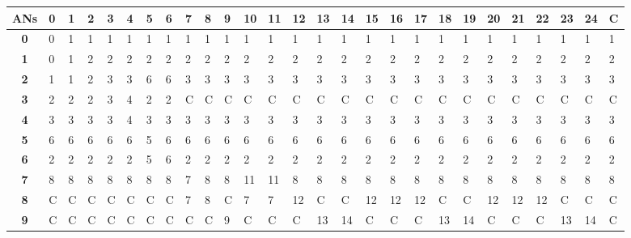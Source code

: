 \begin{table}[ht]\tiny
 \begin{center}
  \begin{tabular}{|c|p{0.1cm}|p{0.1cm}|p{0.1cm}|p{0.1cm}|p{0.1cm}|p{0.1cm}|p{0.1cm}|p{0.1cm}|p{0.1cm}|p{0.1cm}|p{0.1cm}|p{0.1cm}|p{0.1cm}|p{0.1cm}|p{0.1cm}|p{0.1cm}|p{0.1cm}|p{0.1cm}|p{0.1cm}|p{0.1cm}|p{0.1cm}|p{0.1cm}|p{0.1cm}|p{0.1cm}|p{0.1cm}|p{0.1cm}|}
   \hline
   \textbf{\acp{AN}} & \textbf{0} & \textbf{1} & \textbf{2} & \textbf{3} & \textbf{4} & \textbf{5} & \textbf{6} & \textbf{7} & \textbf{8} & 
   \textbf{9} & \textbf{10} & \textbf{11} & \textbf{12} & \textbf{13} & \textbf{14} & \textbf{15} & \textbf{16} & \textbf{17} & \textbf{18} & 
   \textbf{19} & \textbf{20} & \textbf{21} & \textbf{22} & \textbf{23} & \textbf{24} & \textbf{C} \\
   \hline
   \textbf{0} & 0 & 1 & 1 & 1 & 1 & 1 & 1 & 1 & 1 & 1 & 1 & 1 & 1 & 1 & 1 & 1 & 1 & 1 & 1 & 1 & 1 & 1 & 1 & 1 & 1 & 1 \\
   \hline
   \textbf{1} & 0 & 1 & 2 & 2 & 2 & 2 & 2 & 2 & 2 & 2 & 2 & 2 & 2 & 2 & 2 & 2 & 2 & 2 & 2 & 2 & 2 & 2 & 2 & 2 & 2 & 2 \\
   \hline
   \textbf{2} & 1 & 1 & 2 & 3 & 3 & 6 & 6 & 3 & 3 & 3 & 3 & 3 & 3 & 3 & 3 & 3 & 3 & 3 & 3 & 3 & 3 & 3 & 3 & 3 & 3 & 3 \\
   \hline
   \textbf{3} & 2 & 2 & 2 & 3 & 4 & 2 & 2 & C & C & C & C & C & C & C & C & C & C & C & C & C & C & C & C & C & C & C \\
   \hline
   \textbf{4} & 3 & 3 & 3 & 3 & 4 & 3 & 3 & 3 & 3 & 3 & 3 & 3 & 3 & 3 & 3 & 3 & 3 & 3 & 3 & 3 & 3 & 3 & 3 & 3 & 3 & 3 \\
   \hline
   \textbf{5} & 6 & 6 & 6 & 6 & 6 & 5 & 6 & 6 & 6 & 6 & 6 & 6 & 6 & 6 & 6 & 6 & 6 & 6 & 6 & 6 & 6 & 6 & 6 & 6 & 6 & 6 \\
   \hline
   \textbf{6} & 2 & 2 & 2 & 2 & 2 & 5 & 6 & 2 & 2 & 2 & 2 & 2 & 2 & 2 & 2 & 2 & 2 & 2 & 2 & 2 & 2 & 2 & 2 & 2 & 2 & 2 \\
   \hline
   \textbf{7} & 8 & 8 & 8 & 8 & 8 & 8 & 8 & 7 & 8 & 8 & 11 & 11 & 8 & 8 & 8 & 8 & 8 & 8 & 8 & 8 & 8 & 8 & 8 & 8 & 8 & 8 \\
   \hline
   \textbf{8} & C & C & C & C & C & C & C & 7 & 8 & C & 7 & 7 & 12 & C & C & 12 & 12 & 12 & C & C & 12 & 12 & 12 & C & C & C \\
   \hline
   \textbf{9} & C & C & C & C & C & C & C & C & C & 9 & C & C & C & 13 & 14 & C & C & C & 13 & 14 & C & C & C & 13 & 14 & C \\

\end{tabular}
\end{center}
\end{table}
